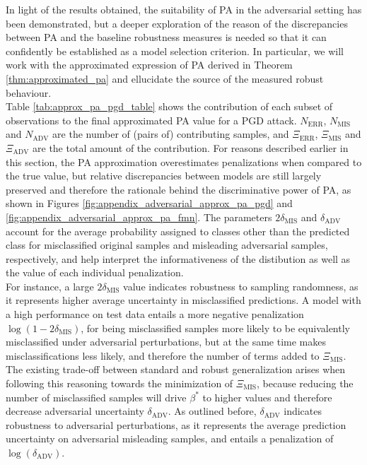 In light of the results obtained, the suitability of
PA in the adversarial setting has been demonstrated, but a deeper exploration of the
reason of the discrepancies between PA and the baseline robustness measures is needed
so that it can confidently be established as a model selection criterion. In particular,
we will work with the approximated expression of PA derived in Theorem \ref{thm:approximated_pa} 
and ellucidate the source of the measured robust behaviour. \\

Table \ref{tab:approx_pa_pgd_table} shows the contribution of each subset of observations to the final
approximated PA value for a PGD attack. $N_{\text{ERR}}$, $N_{\text{MIS}}$ and $N_{\text{ADV}}$ are the number of (pairs of)
contributing samples, and $\Xi_{\text{ERR}}$, $\Xi_{\text{MIS}}$ and $\Xi_{\text{ADV}}$ are
the total amount of the contribution. For reasons described earlier in this section,
the PA approximation overestimates penalizations when compared to the true value, but
relative discrepancies between models are still largely preserved and therefore the rationale
behind the discriminative power of PA, as shown in Figures \ref{fig:appendix_adversarial_approx_pa_pgd}
and \ref{fig:appendix_adversarial_approx_pa_fmn}. The parameters $2 \delta_{\text{MIS}}$ and
$\delta_{\text{ADV}}$ account for the average probability assigned to classes other than the predicted
class for misclassified original samples and misleading adversarial samples, respectively, and 
help interpret the informativeness of the distibution as well as the value of each individual 
penalization. \\

For instance, a large $2 \delta_{\text{MIS}}$ value indicates robustness to sampling randomness, as it
represents higher average uncertainty in misclassified predictions. A model with a high performance on 
test data entails a more negative penalization $\log(1 - 2 \delta_{\text{MIS}})$, for being misclassified 
samples more likely to be equivalently misclassified under adversarial perturbations, but at
the same time makes misclassifications less likely, and therefore the number of terms added to
$\Xi_{\text{MIS}}$. The existing trade-off between standard and robust generalization arises when 
following this reasoning towards the minimization of $\Xi_{\text{MIS}}$, because reducing the number of 
misclassified samples will drive $\beta^{*}$ to higher values and therefore decrease adversarial 
uncertainty $\delta_{\text{ADV}}$. As outlined before, $\delta_{\text{ADV}}$ indicates 
robustness to adversarial perturbations, as it represents the average prediction uncertainty on adversarial 
misleading samples, and entails a penalization of $\log(\delta_{\text{ADV}})$. \\


